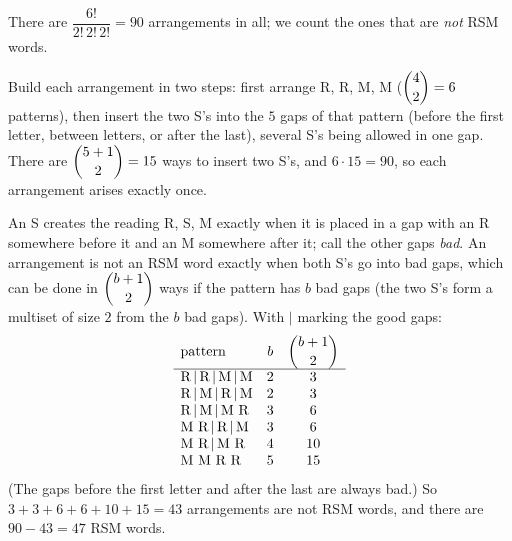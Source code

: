There are $\dfrac{6!}{2!\,2!\,2!}=90$ arrangements in all; we count the ones that are \emph{not} RSM words.

Build each arrangement in two steps: first arrange R, R, M, M ($\dbinom42=6$ patterns), then insert the two S's into the $5$ gaps of that pattern (before the first letter, between letters, or after the last), several S's being allowed in one gap. There are $\dbinom{5+1}{2}=15$ ways to insert two S's, and $6\cdot15=90$, so each arrangement arises exactly once.

An S creates the reading R, S, M exactly when it is placed in a gap with an R somewhere before it and an M somewhere after it; call the other gaps \emph{bad}. An arrangement is not an RSM word exactly when both S's go into bad gaps, which can be done in $\dbinom{b+1}{2}$ ways if the pattern has $b$ bad gaps (the two S's form a multiset of size $2$ from the $b$ bad gaps). With $|$ marking the good gaps:
\[\begin{array}{lcc}
\text{pattern}&b&\dbinom{b+1}{2}\\\hline
\text{R}\,|\,\text{R}\,|\,\text{M}\,|\,\text{M}&2&3\\
\text{R}\,|\,\text{M}\,|\,\text{R}\,|\,\text{M}&2&3\\
\text{R}\,|\,\text{M}\,|\,\text{M}\ \text{R}&3&6\\
\text{M}\ \text{R}\,|\,\text{R}\,|\,\text{M}&3&6\\
\text{M}\ \text{R}\,|\,\text{M}\ \text{R}&4&10\\
\text{M}\ \text{M}\ \text{R}\ \text{R}&5&15
\end{array}\]
(The gaps before the first letter and after the last are always bad.) So $3+3+6+6+10+15=43$ arrangements are not RSM words, and there are $90-43=\boxed{47}$ RSM words.
